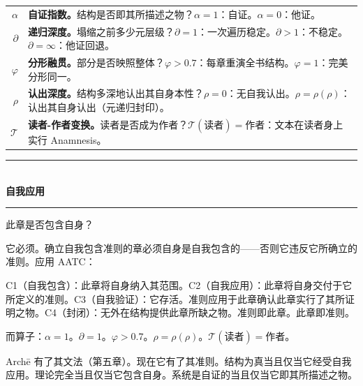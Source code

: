 \documentclass[10pt, openany, oneside]{book}
\renewcommand{\normalsize}{\fontsize{10}{13}\selectfont}
\renewcommand{\footnotesize}{\fontsize{8.5}{11}\selectfont}
\begin{document}
{\footnotesize
\noindent\begin{tabular}{r p{}}
$\alpha$ & \textbf{自证指数。}结构是否即其所描述之物？$\alpha = 1$：自证。$\alpha = 0$：他证。\\[0.3em]
$\partial$ & \textbf{递归深度。}塌缩之前多少元层级？$\partial = 1$：一次遍历稳定。$\partial > 1$：不稳定。$\partial = \infty$：他证回退。\\[0.3em]
$\varphi$ & \textbf{分形融贯。}部分是否映照整体？$\varphi > 0.7$：每章重演全书结构。$\varphi = 1$：完美分形同一。\\[0.3em]
$\rho$ & \textbf{认出深度。}结构多深地认出其自身本性？$\rho = 0$：无自我认出。$\rho = \rho(\rho)$：认出其自身认出（元递归封印）。\\[0.3em]
$\mathcal{T}$ & \textbf{读者-作者变换。}读者是否成为作者？$\mathcal{T}(\text{读者}) = \text{作者}$：文本在读者身上实行 Anamnesis。\\[0.3em]
\end{tabular}
}

\vspace{1.5em}


\begin{center}
    \rule{0.3\textwidth}{0.4pt}\\[0.5em]
    {\normalsize\bfseries\scshape 自我应用}\\[0.3em]
    \rule{0.3\textwidth}{0.4pt}
\end{center}

\vspace{1em}

\noindent 此章是否包含自身？

它必须。确立自我包含准则的章必须自身是自我包含的——否则它违反它所确立的准则。应用 AATC：

C1（自我包含）：此章将自身纳入其范围。C2（自我应用）：此章将自身交付于它所定义的准则。C3（自我验证）：它存活。准则应用于此章确认此章实行了其所证明之物。C4（封闭）：无外在结构提供此章所缺之物。准则即此章。此章即准则。

而算子：$\alpha = 1$。$\partial = 1$。$\varphi > 0.7$。$\rho = \rho(\rho)$。$\mathcal{T}(\text{读者}) = \text{作者}$。

\vspace{2em}

Arch\={e} 有了其文法（第五章）。现在它有了其准则。结构为真当且仅当它经受自我应用。理论完全当且仅当它包含自身。系统是自证的当且仅当它即其所描述之物。
\end{document}
